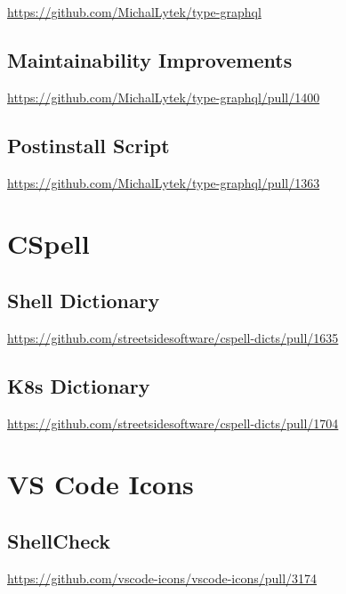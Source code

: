\url{https://github.com/MichalLytek/type-graphql}

\subsection{Maintainability Improvements}
\label{subsec:contributions_typegraphql_maintainability_improvements}

\url{https://github.com/MichalLytek/type-graphql/pull/1400}

\subsection{Postinstall Script}
\label{subsec:contributions_typegraphql_postinstall_script}

\url{https://github.com/MichalLytek/type-graphql/pull/1363}

\section{CSpell}
\label{sec:contributions_cspell}

\subsection{Shell Dictionary}
\label{subsec:contributions_cspell_shell_dictionary}

\url{https://github.com/streetsidesoftware/cspell-dicts/pull/1635}

\subsection{K8s Dictionary}
\label{subsec:contributions_cspell_k8s_dictionary}

\url{https://github.com/streetsidesoftware/cspell-dicts/pull/1704}

\section{VS Code Icons}
\label{sec:contributions_vscode_icons}

\subsection{ShellCheck}
\label{subsec:contributions_vscode_icons_shellcheck}

\url{https://github.com/vscode-icons/vscode-icons/pull/3174}